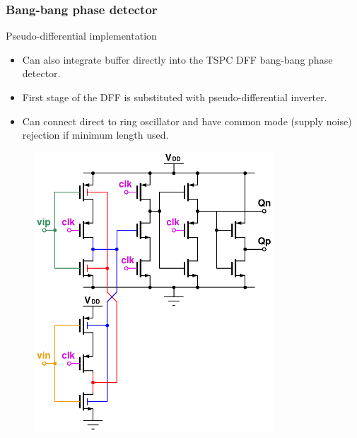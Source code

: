 \documentclass[t, screen, aspectratio=43]{beamer}
\begin{document}
\begin{frame}
	\frametitle{Bang-bang phase detector}
	\begin{block}{Pseudo-differential implementation}
		\begin{minipage}{6cm}
			\vspace{1em}
			\tiny

			\begin{itemize}[itemsep=4pt,label=\protect---]
				\item Can also integrate buffer directly into the TSPC DFF bang-bang phase detector. 
				\item First stage of the DFF is substituted with pseudo-differential inverter.
				\item Can connect direct to ring oscillator and have common mode (supply noise) rejection if minimum length used.
			\end{itemize}
		\end{minipage}%
		\begin{minipage}{6cm}
			\begin{figure}[htb!]
			        \centering
			        \includegraphics[width=0.8\textwidth, angle=0]{etspc_pseudodiff}
			\end{figure}
		\end{minipage}%

	\end{block}	
\end{frame}
\end{document}
